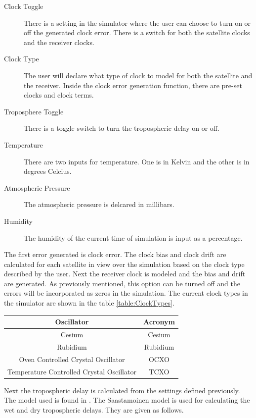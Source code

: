 \documentclass[12pt]{report}
\begin{document}
\begin{description}
    \item[Clock Toggle] There is a setting in the simulator where the user can choose to turn on or off the generated clock error. There is a switch for both the satellite clocks and the receiver clocks.
    \item[Clock Type] The user will declare what type of clock to model for both the satellite and the receiver. Inside the clock error generation function, there are pre-set clocks and clock terms.
    \item[Troposphere Toggle] There is a toggle switch to turn the tropospheric delay on or off.
    \item[Temperature] There are two inputs for temperature. One is in Kelvin and the other is in degrees Celcius. 
    \item[Atmospheric Pressure] The atmospheric pressure is delcared in millibars.
    \item[Humidity] The humidity of the current time of simulation is input as a percentage.     
\end{description}


The first error generated is clock error. The clock bias and clock drift are calculated for each satellite in view over the simulation based on the clock type described by the user. Next the receiver clock is modeled and the bias and drift are generated. As previously mentioned, this option can be turned off and the errors will be incorporated as zeros in the simulation. The current clock types in the simulator are shown in the table \ref{table:ClockTypes}. 

\begin{center}
\begin{tabular}{|c|c|}
    \hline
    Oscillator & Acronym\\
    \hline\hline
    Cesium & Cesium\\
    \hline
    Rubidium & Rubidium\\
    \hline
    Oven Controlled Crystal Oscillator & OCXO\\
    \hline
    Temperature Controlled Crystal Oscillator & TCXO\\
    \hline
\end{tabular}
\label{table:ClockTypes}

\end{center}

Next the tropospheric delay is calculated from the settings defined previously. The model used is found in \cite{misraGlobalPositioningSystem2012}. The Saastamoinen model is used for calculating the wet and dry tropospheric delays. They are given as follows. 
\end{document}
